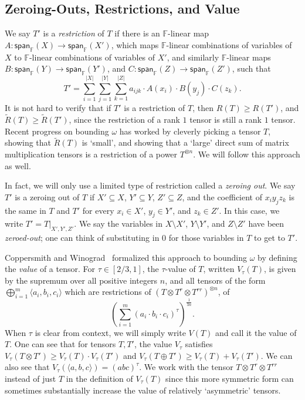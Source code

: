 \documentclass{theoretics}
\newcommand{\F}{\mathbb{F}}
\begin{document}
\subsection{Zeroing-Outs, Restrictions, and Value}

We say $T'$ is a \emph{restriction} of $T$ if there is an $\F$-linear map $A : \textsf{span}_\F(X) \to \textsf{span}_\F(X')$, which maps $\F$-linear combinations of variables of $X$ to $\F$-linear combinations of variables of $X'$, and similarly $\F$-linear maps $B : \textsf{span}_\F(Y) \to \textsf{span}_\F(Y')$, and $C : \textsf{span}_\F(Z) \to \textsf{span}_\F(Z')$, such that  $$T' = \sum_{i=1}^{|X|} \sum_{j=1}^{|Y|} \sum_{k=1}^{|Z|} a_{ijk} \cdot A(x_i) \cdot B(y_j) \cdot C(z_k).$$
It is not hard to verify that if $T'$ is a restriction of $T$, then $R(T) \geq R(T')$, and $\tilde{R}(T) \geq \tilde{R}(T')$, since the restriction of a rank $1$ tensor is still a rank $1$ tensor. Recent progress on bounding $\omega$ has worked by cleverly picking a tensor $T$, showing that $\tilde{R}(T)$ is `small', and showing that a `large' direct sum of matrix multiplication tensors is a restriction of a power $T^{\otimes n}$. We will follow this approach as well.

In fact, we will only use a limited type of restriction called a \emph{zeroing out}. We say $T'$ is a zeroing out of $T$ if $X' \subseteq X$, $Y' \subseteq Y$, $Z' \subseteq Z$, and the coefficient of $x_i y_j z_k$ is the same in $T$ and $T'$ for every $x_i \in X'$, $y_j \in Y'$, and $z_k \in Z'$. In this case, we write $T' = T|_{X',Y',Z'}$. We say the variables in $X \setminus X'$, $Y \setminus Y'$, and $Z \setminus Z'$ have been \emph{zeroed-out}; one can think of substituting in $0$ for those variables in $T$ to get to $T'$.

Coppersmith and Winograd~\cite{coppersmith} formalized this approach to bounding $\omega$ by defining the \emph{value} of a tensor. For $\tau \in [2/3,1]$, the $\tau$-value of $T$, written $V_\tau(T)$, is given by the supremum over all positive integers $n$, and all tensors of the form $\bigoplus_{i=1}^m \langle a_i,b_i,c_i \rangle$ which are restrictions of $(T \otimes T^r \otimes T^{rr})^{\otimes n}$, of $$\left( \sum_{i=1}^m (a_i \cdot b_i \cdot c_i)^\tau \right)^{\frac{1}{3n}}.$$ When $\tau$ is clear from context, we will simply write $V(T)$ and call it the value of $T$. One can see that for tensors $T,T'$, the value $V_\tau$ satisfies $V_\tau(T\otimes T')\geq V_\tau(T) \cdot V_\tau(T')$ and $V_\tau(T\oplus T')\geq V_\tau(T)+V_\tau(T')$. We can also see that $V_\tau(\langle a,b,c \rangle) = (abc)^\tau$. We work with the tensor $T \otimes T^r \otimes T^{rr}$ instead of just $T$ in the definition of $V_\tau(T)$ since this more symmetric form can sometimes substantially increase the value of relatively `asymmetric' tensors.
\end{document}
